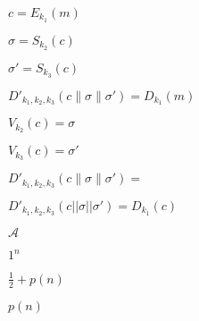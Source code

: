 \documentclass[10pt]{book}
\begin{document}
\begin{mdSnippets}
\begin{mdInlineSnippet}%
$c=E_{k_1}(m)$\end{mdInlineSnippet}%
\begin{mdInlineSnippet}[c166f30e21d90159f3d73e2b6a44a225]%
$\sigma=S_{k_2}(c)$\end{mdInlineSnippet}%
\begin{mdInlineSnippet}[944a3a7552a7c2dd09c95c2de5045fe7]%
$\sigma'=S_{k_3}(c)$\end{mdInlineSnippet}%
\begin{mdInlineSnippet}[5f3759e058e65d2a01427d967a1021ad]%
$D'_{k_1,k_2,k_3}(c\|\sigma\|\sigma')=D_{k_1}(m)$\end{mdInlineSnippet}%
\begin{mdInlineSnippet}%
$V_{k_2}(c)=\sigma$\end{mdInlineSnippet}%
\begin{mdInlineSnippet}[73c9ec4c45c3942c02cf50d63e28eeb8]%
$V_{k_3}(c)=\sigma'$\end{mdInlineSnippet}%
\begin{mdInlineSnippet}[8f7f844c9b084b0e07dbca89f181868a]%
$D'_{k_1,k_2,k_3}(c\|\sigma\|\sigma')=$\end{mdInlineSnippet}%
\begin{mdInlineSnippet}[d5a91a394ac288c2614dec32a75857d4]%
$D'_{k_1,k_2,k_3}(c || \sigma || \sigma') = D_{k_1}(c)$\end{mdInlineSnippet}%
\begin{mdInlineSnippet}[ad70146b431bea9ae74cf8385470c544]%
$\mathcal{A}$\end{mdInlineSnippet}%
\begin{mdInlineSnippet}%
$1^n$\end{mdInlineSnippet}%
\begin{mdInlineSnippet}[64f5991003da134cc68fa343d048ebac]%
$\frac{1}{2} + p(n)$\end{mdInlineSnippet}%
\begin{mdInlineSnippet}%
$p(n)$\end{mdInlineSnippet}%
\begin{mdInlineSnippet}[fed1e4775925bd3f7af0c5d8fc47e4e6]%

\end{mdInlineSnippet}
\end{mdSnippets}
\end{document}
